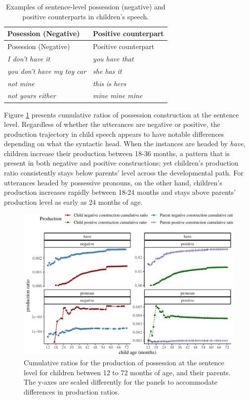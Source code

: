 \documentclass[
  english,
  man,floatsintext]{apa6}
\begin{document}
\begin{longtable}[]{@{}ll@{}}
\caption{\label{tab:possess} Examples of sentence-level possession (negative) and positive counterparts in children's speech.}\tabularnewline
\toprule
Posession (Negative) & Positive counterpart \\
\midrule
\endfirsthead
\toprule
Posession (Negative) & Positive counterpart \\
\midrule
\endhead
\emph{I don't have it} & \emph{you have that} \\
\emph{you don't have my toy car} & \emph{she has it} \\
\emph{not mine} & \emph{this is hers} \\
\emph{not yours either} & \emph{mine mine mine} \\
\bottomrule
\end{longtable}

Figure \ref{fig:possession} presents cumulative ratios of possession construction at the sentence level. Regardless of whether the utterances are negative or positive, the production trajectory in child speech appears to have notable differences depending on what the syntactic head. When the instances are headed by \emph{have}, children increase their production between 18-36 months, a pattern that is present in both negative and positive constructions; yet children's production ratio consistently stays below parents' level across the developmental path. For utterances headed by possessive pronouns, on the other hand, children's production increases rapidly between 18-24 months and stays above parents' production level as early as 24 months of age.

\begin{figure}[H]

{\centering \includegraphics{neg_construction_article_files/figure-latex/possession-1} 

}

\caption{Cumulative ratios for the production of possession at the sentence level for children between 12 to 72 months of age, and their parents. The y-axes are scaled differently for the panels to accommodate differences in production ratios.}\label{fig:possession}
\end{figure}
\end{document}
